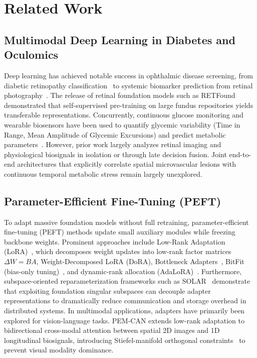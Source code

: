 \documentclass[journal,10pt,twocolumn]{IEEEtran}
\begin{document}
\section{Related Work}
\label{sec:related_work}

\subsection{Multimodal Deep Learning in Diabetes and Oculomics}
Deep learning has achieved notable success in ophthalmic disease screening, from diabetic retinopathy classification~\cite{gulshan2016development,ting2017development} to systemic biomarker prediction from retinal photography~\cite{poplin2018prediction,wagner2020insights}. The release of retinal foundation models such as RETFound~\cite{zhou2023retfound} demonstrated that self-supervised pre-training on large fundus repositories yields transferable representations. Concurrently, continuous glucose monitoring and wearable biosensors have been used to quantify glycemic variability (Time in Range, Mean Amplitude of Glycemic Excursions) and predict metabolic parameters~\cite{danne2017international,battelino2023continuous,dunn2021wearable}. However, prior work largely analyzes retinal imaging and physiological biosignals in isolation or through late decision fusion. Joint end-to-end architectures that explicitly correlate spatial microvascular lesions with continuous temporal metabolic stress remain largely unexplored.

\subsection{Parameter-Efficient Fine-Tuning (PEFT)}
To adapt massive foundation models without full retraining, parameter-efficient fine-tuning (PEFT) methods update small auxiliary modules while freezing backbone weights. Prominent approaches include Low-Rank Adaptation (LoRA)~\cite{hu2022lora}, which decomposes weight updates into low-rank factor matrices $\Delta W = BA$, Weight-Decomposed LoRA (DoRA), Bottleneck Adapters~\cite{houlsby2019parameter}, BitFit (bias-only tuning)~\cite{zaken2022bitfit}, and dynamic-rank allocation (AdaLoRA)~\cite{zhang2023adalora}. Furthermore, subspace-oriented reparameterization frameworks such as SOLAR~\cite{sajjadi2026solar} demonstrate that exploiting foundation singular subspaces can decouple adapter representations to dramatically reduce communication and storage overhead in distributed systems. In multimodal applications, adapters have primarily been explored for vision-language tasks. PEM-CAN extends low-rank adaptation to bidirectional cross-modal attention between spatial 2D images and 1D longitudinal biosignals, introducing Stiefel-manifold orthogonal constraints~\cite{edelman1998geometry} to prevent visual modality dominance.
\end{document}

